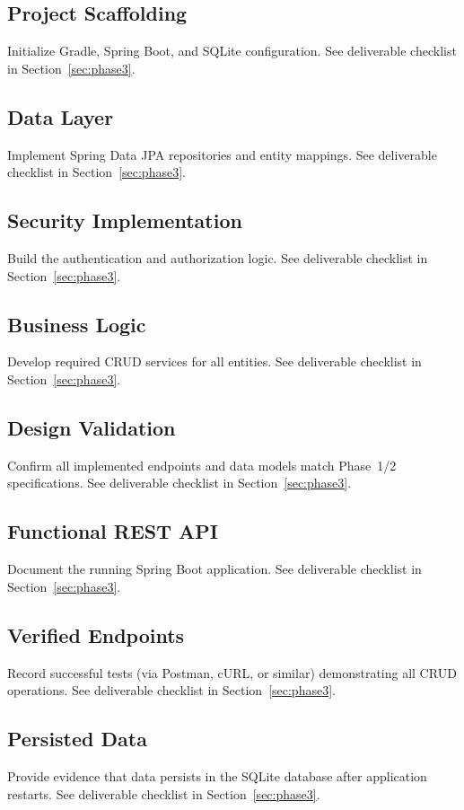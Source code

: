 \newpage
\subsection{Project Scaffolding}\label{sec:be-scaffolding}
Initialize Gradle, Spring Boot, and SQLite configuration.
See deliverable checklist in Section~\ref{sec:phase3}.

\newpage
\subsection{Data Layer}\label{sec:data-layer}
Implement Spring Data JPA repositories and entity mappings.
See deliverable checklist in Section~\ref{sec:phase3}.

\newpage
\subsection{Security Implementation}\label{sec:security-impl}
Build the authentication and authorization logic.
See deliverable checklist in Section~\ref{sec:phase3}.

\newpage
\subsection{Business Logic}\label{sec:business-logic}
Develop required CRUD services for all entities.
See deliverable checklist in Section~\ref{sec:phase3}.

\newpage
\subsection{Design Validation}\label{sec:be-design-validation}
Confirm all implemented endpoints and data models match Phase~1/2 specifications.
See deliverable checklist in Section~\ref{sec:phase3}.

\newpage
\subsection{Functional REST API}\label{sec:functional-api}
Document the running Spring Boot application.
See deliverable checklist in Section~\ref{sec:phase3}.

\newpage
\subsection{Verified Endpoints}\label{sec:verified-endpoints}
Record successful tests (via Postman, cURL, or similar) demonstrating all CRUD operations.
See deliverable checklist in Section~\ref{sec:phase3}.

\newpage
\subsection{Persisted Data}\label{sec:persisted-data}
Provide evidence that data persists in the SQLite database after application restarts.
See deliverable checklist in Section~\ref{sec:phase3}.

\newpage
